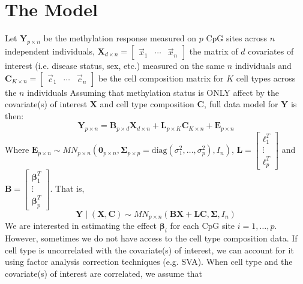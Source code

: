 \documentclass{article}
\begin{document}
\section{The Model}
Let $\bm{Y}_{p \times n}$ be the methylation response measured on $p$ CpG sites across $n$ independent individuals, $\bm{X}_{d \times n} = \left[ \begin{matrix}
\vec{x}_1 & \cdots & \vec{x}_n
\end{matrix} \right]$ the matrix of $d$ covariates of interest (i.e. disease status, sex, etc.) measured on the same $n$ individuals and $\bm{C}_{K \times n} = \left[ \begin{matrix}
\vec{c}_1 & \cdots & \vec{c}_n
\end{matrix} \right]$ be the cell composition matrix for $K$ cell types across the $n$ individuals  Assuming that methylation status is ONLY affect by the covariate(s) of interest $\bm{X}$ and cell type composition $\bm{C}$, full data model for $\bm{Y}$ is then:
\begin{equation}
\bm{Y}_{p \times n} = \bm{B}_{p \times d}\bm{X}_{d \times n} + \bm{L}_{p \times K}\bm{C}_{K \times n} + \bm{E}_{p \times n}
\end{equation}
Where $\bm{E}_{p \times n} \sim MN_{p \times n}\left( \bm{0}_{p\times n}, \bm{\Sigma}_{p \times p} = \text{diag}\left( \sigma_1^2, \ldots, \sigma_p^2 \right), I_{n} \right)$, $\bm{L} = \left[ \begin{matrix}
\bm{\ell}_1^T\\
\vdots\\
\bm{\ell}_p^T
\end{matrix} \right]$ and $\bm{B} = \left[ \begin{matrix}
\bm{\beta}_1^T\\
\vdots\\
\bm{\beta}_p^T
\end{matrix} \right]$. That is,
\begin{equation}
\bm{Y} \mid \left( \bm{X}, \bm{C} \right) \sim MN_{p \times n}\left( \bm{B}\bm{X} + \bm{L}\bm{C}, \bm{\Sigma}, I_n \right)
\end{equation}
We are interested in estimating the effect $\bm{\beta}_i$ for each CpG site $i = 1, \ldots, p$.\\
\indent However, sometimes we do not have access to the cell type composition data. If cell type is uncorrelated with the covariate(s) of interest, we can account for it using factor analysis correction techniques (e.g. SVA). When cell type and the covariate(s) of interest are correlated, we assume that
\end{document}

